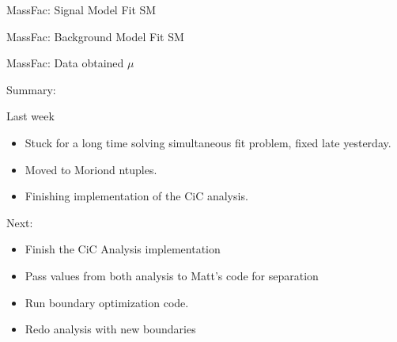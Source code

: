 \documentclass[8pt]{beamer}
\begin{document}
\begin{frame}{MassFac: Signal Model Fit SM}
  
  
  
\end{frame}

\begin{frame}{MassFac: Background Model Fit SM}
  
\end{frame}

\begin{frame}{MassFac: Data obtained $\mu$}
  
\end{frame}

\begin{frame}{Summary:}
 
  \begin{block}{Last week}

  \begin{itemize}
    \item Stuck for a long time solving simultaneous fit problem, fixed late yesterday.
    \item Moved to Moriond ntuples.
    \item Finishing implementation of the CiC analysis.
  \end{itemize}

  \end{block}

  \begin{block}{Next:}

    \begin{itemize}
      \item Finish the CiC Analysis implementation
      \item Pass values from both analysis to Matt's code for separation
      \item Run boundary optimization code.
      \item Redo analysis with new boundaries
    \end{itemize}

  \end{block}
  
\end{frame}
\end{document}
